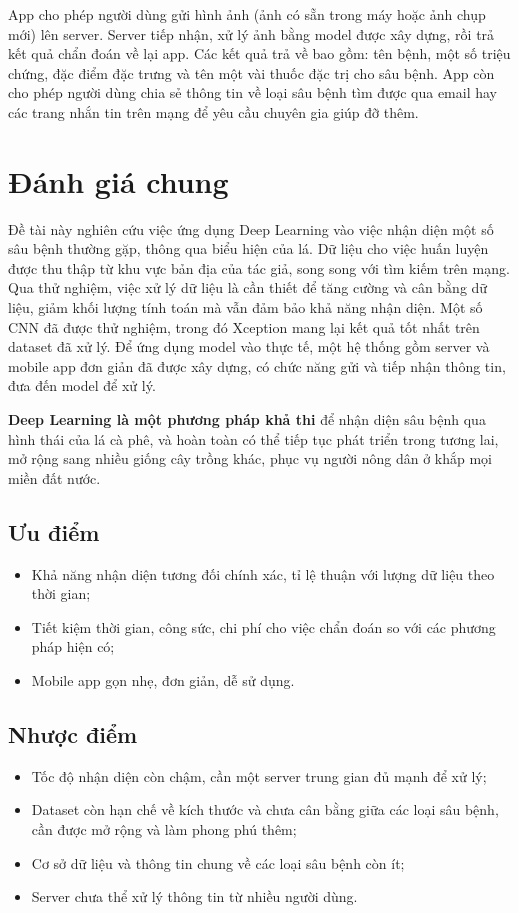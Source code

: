 \documentclass[a4paper,14pt]{extarticle}
\begin{document}
	App cho phép người dùng gửi hình ảnh (ảnh có sẵn trong máy hoặc ảnh chụp mới) lên server. Server tiếp nhận, xử lý ảnh bằng model được xây dựng, rồi trả kết quả chẩn đoán về lại app. Các kết quả trả về bao gồm: tên bệnh, một số triệu chứng, đặc điểm đặc trưng và tên một vài thuốc đặc trị cho sâu bệnh. App còn cho phép người dùng chia sẻ thông tin về loại sâu bệnh tìm được qua email hay các trang nhắn tin trên mạng để yêu cầu chuyên gia giúp đỡ thêm.

\section{Đánh giá chung}
	Đề tài này nghiên cứu việc ứng dụng Deep Learning vào việc nhận diện một số sâu bệnh thường gặp, thông qua biểu hiện của lá. Dữ liệu cho việc huấn luyện được thu thập từ khu vực bản địa của tác giả, song song với tìm kiếm trên mạng. Qua thử nghiệm, việc xử lý dữ liệu là cần thiết để tăng cường và cân bằng dữ liệu, giảm khối lượng tính toán mà vẫn đảm bảo khả năng nhận diện. Một số CNN đã được thử nghiệm, trong đó Xception mang lại kết quả tốt nhất trên dataset đã xử lý. Để ứng dụng model vào thực tế, một hệ thống gồm server và mobile app đơn giản đã được xây dựng, có chức năng gửi và tiếp nhận thông tin, đưa đến model để xử lý.
	
	\textbf{Deep Learning là một phương pháp khả thi} để nhận diện sâu bệnh qua hình thái của lá cà phê, và hoàn toàn có thể tiếp tục phát triển trong tương lai, mở rộng sang nhiều giống cây trồng khác, phục vụ người nông dân ở khắp mọi miền đất nước.

	\subsection{Ưu điểm}
	\begin{itemize}
		\item Khả năng nhận diện tương đối chính xác, tỉ lệ thuận với lượng dữ liệu theo thời gian;
		\item Tiết kiệm thời gian, công sức, chi phí cho việc chẩn đoán so với các phương pháp hiện có;
		\item Mobile app gọn nhẹ, đơn giản, dễ sử dụng.
	\end{itemize}

	\subsection{Nhược điểm}
	\begin{itemize}
		\item Tốc độ nhận diện còn chậm, cần một server trung gian đủ mạnh để xử lý;
		\item Dataset còn hạn chế về kích thước và chưa cân bằng giữa các loại sâu bệnh, cần được mở rộng và làm phong phú thêm;
		\item Cơ sở dữ liệu và thông tin chung về các loại sâu bệnh còn ít;
		\item Server chưa thể xử lý thông tin từ nhiều người dùng.
	\end{itemize}
\end{document}
